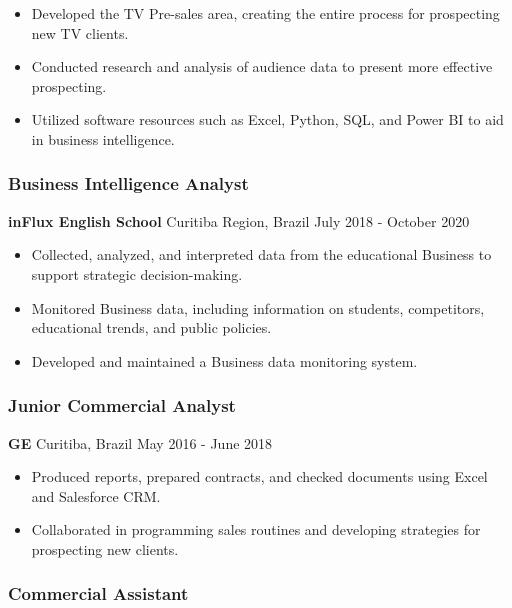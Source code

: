 \documentclass[
]{article}
\providecommand{\tightlist}{%
  \setlength{\itemsep}{0pt}\setlength{\parskip}{0pt}}
\begin{document}
\begin{itemize}
\tightlist
\item
  Developed the TV Pre-sales area, creating the entire process for
  prospecting new TV clients.
\item
  Conducted research and analysis of audience data to present more
  effective prospecting.
\item
  Utilized software resources such as Excel, Python, SQL, and Power BI
  to aid in business intelligence.
\end{itemize}

\subsubsection{Business Intelligence
Analyst}\label{business-intelligence-analyst}

\textbf{inFlux English School} \textbar{} Curitiba Region, Brazil
\textbar{} July 2018 - October 2020

\begin{itemize}
\tightlist
\item
  Collected, analyzed, and interpreted data from the educational
  Business to support strategic decision-making.
\item
  Monitored Business data, including information on students,
  competitors, educational trends, and public policies.
\item
  Developed and maintained a Business data monitoring system.
\end{itemize}

\subsubsection{Junior Commercial
Analyst}\label{junior-commercial-analyst}

\textbf{GE} \textbar{} Curitiba, Brazil \textbar{} May 2016 - June 2018

\begin{itemize}
\tightlist
\item
  Produced reports, prepared contracts, and checked documents using
  Excel and Salesforce CRM.
\item
  Collaborated in programming sales routines and developing strategies
  for prospecting new clients.
\end{itemize}

\subsubsection{Commercial Assistant}\label{commercial-assistant}
\end{document}
